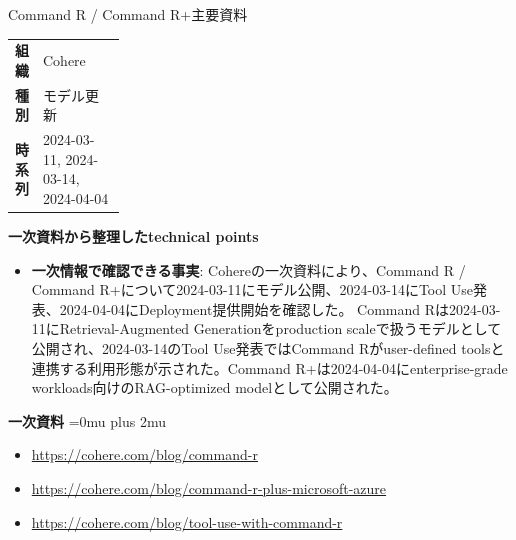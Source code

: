 \Needspace{0.38\textheight}
\begin{technicalnote}{Command R / Command R+}{主要資料}
\begingroup
\begin{tabularx}{\linewidth}{@{}>{\bfseries}p{0.22\linewidth}X@{}}
組織 & Cohere \\
種別 & モデル更新 \\
時系列 & 2024-03-11, 2024-03-14, 2024-04-04 \\
\end{tabularx}
\smallskip
\begin{minipage}{\linewidth}
{\bfseries 一次資料から整理したtechnical points}
\begin{itemize}[leftmargin=1.5em,itemsep=0.35em]
\item \textbf{一次情報で確認できる事実}: Cohereの一次資料により、Command R / Command R+について2024-03-11にモデル公開、2024-03-14にTool Use発表、2024-04-04にDeployment提供開始を確認した。 Command Rは2024-03-11にRetrieval-Augmented Generationをproduction scaleで扱うモデルとして公開され、2024-03-14のTool Use発表ではCommand Rがuser-defined toolsと連携する利用形態が示された。Command R+は2024-04-04にenterprise-grade workloads向けのRAG-optimized modelとして公開された。
\end{itemize}
\begin{minipage}{\linewidth}
\begin{samepage}
{\bfseries 一次資料}
\begingroup\sloppy
\Urlmuskip=0mu plus 2mu\relax
\begin{itemize}[leftmargin=1.5em,itemsep=0.25em]
\item {\scriptsize\url{https://cohere.com/blog/command-r}}
\item {\scriptsize\url{https://cohere.com/blog/command-r-plus-microsoft-azure}}
\item {\scriptsize\url{https://cohere.com/blog/tool-use-with-command-r}}
\end{itemize}
\endgroup
\end{samepage}
\end{minipage}
\end{minipage}
\endgroup
\end{technicalnote}
\medskip

